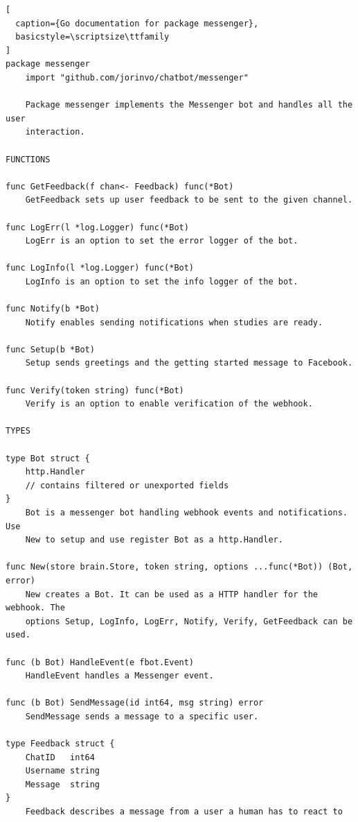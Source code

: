 \pagebreak
\begin{lstlisting}[
  caption={Go documentation for package messenger},
  basicstyle=\scriptsize\ttfamily
]
package messenger
    import "github.com/jorinvo/chatbot/messenger"

    Package messenger implements the Messenger bot and handles all the user
    interaction.

FUNCTIONS

func GetFeedback(f chan<- Feedback) func(*Bot)
    GetFeedback sets up user feedback to be sent to the given channel.

func LogErr(l *log.Logger) func(*Bot)
    LogErr is an option to set the error logger of the bot.

func LogInfo(l *log.Logger) func(*Bot)
    LogInfo is an option to set the info logger of the bot.

func Notify(b *Bot)
    Notify enables sending notifications when studies are ready.

func Setup(b *Bot)
    Setup sends greetings and the getting started message to Facebook.

func Verify(token string) func(*Bot)
    Verify is an option to enable verification of the webhook.

TYPES

type Bot struct {
    http.Handler
    // contains filtered or unexported fields
}
    Bot is a messenger bot handling webhook events and notifications. Use
    New to setup and use register Bot as a http.Handler.

func New(store brain.Store, token string, options ...func(*Bot)) (Bot, error)
    New creates a Bot. It can be used as a HTTP handler for the webhook. The
    options Setup, LogInfo, LogErr, Notify, Verify, GetFeedback can be used.

func (b Bot) HandleEvent(e fbot.Event)
    HandleEvent handles a Messenger event.

func (b Bot) SendMessage(id int64, msg string) error
    SendMessage sends a message to a specific user.

type Feedback struct {
    ChatID   int64
    Username string
    Message  string
}
    Feedback describes a message from a user a human has to react to
\end{lstlisting}


